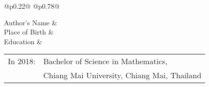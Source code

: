 \begin{vita}
\noindent\begin{tabular}{@{}p{}@{} @{}p{}@{}}

Author's Name	& 	\printNamePrefix\printAuthor\\[11pt]


Place of Birth	&	\printPlaceOfBirth\\[11pt]

Education 		&	
\begin{tabular}[t]{@{}p{}@{} @{}p{}@{}}
	In 2018:	& 	Bachelor of Science in Mathematics, \\ & Chiang Mai University, Chiang Mai, Thailand\\[11pt]
\end{tabular}\\
\end{tabular}
\end{vita}